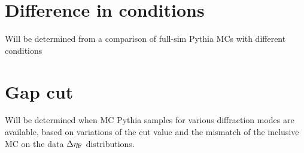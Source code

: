 



\section{Difference in conditions}
{\blue Will be determined from a comparison of full-sim Pythia MCs with different conditions}
\section{Gap cut} 
{\blue Will be determined when MC Pythia samples for various diffraction modes are available, based on variations of the cut value and the mismatch of the inclusive MC on the data $\Delta \eta_{\mathrm{F}}$ distributions.}


